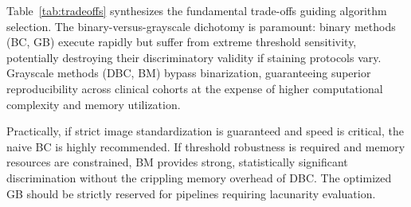 Table~\ref{tab:tradeoffs} synthesizes the fundamental trade-offs guiding algorithm selection. The binary-versus-grayscale dichotomy is paramount: binary methods (BC, GB) execute rapidly but suffer from extreme threshold sensitivity, potentially destroying their discriminatory validity if staining protocols vary. Grayscale methods (DBC, BM) bypass binarization, guaranteeing superior reproducibility across clinical cohorts at the expense of higher computational complexity and memory utilization. 

Practically, if strict image standardization is guaranteed and speed is critical, the naive BC is highly recommended. If threshold robustness is required and memory resources are constrained, BM provides strong, statistically significant discrimination without the crippling memory overhead of DBC. The optimized GB should be strictly reserved for pipelines requiring lacunarity evaluation.